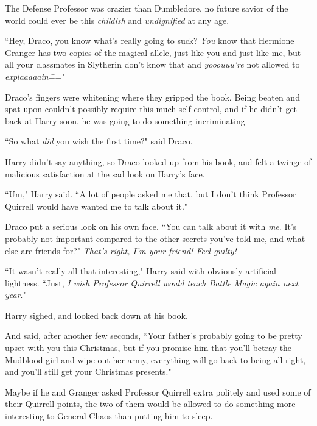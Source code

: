 The Defense Professor was crazier than Dumbledore, no future savior of the world could ever be this \emph{childish} and \emph{undignified} at any age.

``Hey, Draco, you know what's really going to suck? \emph{You} know that Hermione Granger has two copies of the magical allele, just like you and just like me, but all your classmates in Slytherin don't know that and \emph{yooouuu're} not allowed to \emph{explaaaaain}\==="

Draco's fingers were whitening where they gripped the book. Being beaten and spat upon couldn't possibly require this much self-control, and if he didn't get back at Harry soon, he was going to do something incriminating\---

``So what \emph{did} you wish the first time?" said Draco.

Harry didn't say anything, so Draco looked up from his book, and felt a twinge of malicious satisfaction at the sad look on Harry's face.

``Um," Harry said. ``A lot of people asked me that, but I don't think Professor Quirrell would have wanted me to talk about it."

Draco put a serious look on his own face. ``You can talk about it with \emph{me}. It's probably not important compared to the other secrets you've told me, and what else are friends for?" \emph{That's right, I'm your friend! Feel guilty!}

``It wasn't really all that interesting," Harry said with obviously artificial lightness. ``Just, \emph{I wish Professor Quirrell would teach Battle Magic again next year}."

Harry sighed, and looked back down at his book.

And said, after another few seconds, ``Your father's probably going to be pretty upset with you this Christmas, but if you promise him that you'll betray the Mudblood girl and wipe out her army, everything will go back to being all right, and you'll still get your Christmas presents."

Maybe if he and Granger asked Professor Quirrell extra politely and used some of their Quirrell points, the two of them would be allowed to do something more interesting to General Chaos than putting him to sleep.

